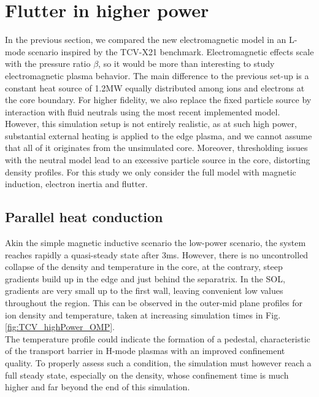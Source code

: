 \section{Flutter in higher power}

In the previous section, we compared the new electromagnetic model in an L-mode scenario inspired by the TCV-X21 benchmark. Electromagnetic effects scale with the pressure ratio $\beta$, so it would be more than interesting to study electromagnetic plasma behavior. The main difference to the previous set-up is a constant heat source of 1.2MW equally distributed among ions and electrons at the core boundary. For higher fidelity, we also replace the fixed particle source by interaction with fluid neutrals using the most recent implemented model\cite{quadri2024}. However, this simulation setup is not entirely realistic, as at such high power, substantial external heating is applied to the edge plasma, and we cannot assume that all of it originates from the unsimulated core. Moreover, thresholding issues with the neutral model lead to an excessive particle source in the core, distorting density profiles. For this study we only consider the full model with magnetic induction, electron inertia and flutter.  \\



\subsection{Parallel heat conduction}

Akin the simple magnetic inductive scenario the low-power scenario, the system reaches rapidly a quasi-steady state after 3ms. However, there is no uncontrolled collapse of the density and temperature in the core, at the contrary, steep gradients build up in the edge and just behind the separatrix. In the SOL, gradients are very small up to the first wall, leaving convenient low values throughout the region. This can be observed in the outer-mid plane profiles for ion density and temperature, taken at increasing simulation times in Fig. \ref{fig:TCV_highPower_OMP}. \\

The temperature profile could indicate the formation of a pedestal, characteristic of the transport barrier in H-mode plasmas with an improved confinement quality. To properly assess such a condition, the simulation must however reach a full steady state, especially on the density, whose confinement time is much higher and far beyond the end of this simulation. \\


